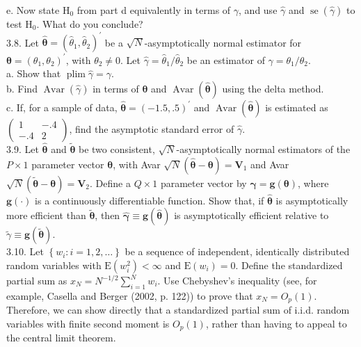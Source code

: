\documentclass[10pt]{article}
\begin{document}
e. Now state $\mathrm{H}_{0}$ from part d equivalently in terms of $\gamma$, and use $\hat{\gamma}$ and $\operatorname{se}(\hat{\gamma})$ to test $\mathrm{H}_{0}$. What do you conclude?\\
3.8. Let $\hat{\boldsymbol{\theta}}=\left(\hat{\theta}_{1}, \hat{\theta}_{2}\right)^{\prime}$ be a $\sqrt{N}$-asymptotically normal estimator for $\boldsymbol{\theta}=\left(\theta_{1}, \theta_{2}\right)^{\prime}$, with $\theta_{2} \neq 0$. Let $\hat{\gamma}=\hat{\theta}_{1} / \hat{\theta}_{2}$ be an estimator of $\gamma=\theta_{1} / \theta_{2}$.\\
a. Show that $\operatorname{plim} \hat{\gamma}=\gamma$.\\
b. Find $\operatorname{Avar}(\hat{\gamma})$ in terms of $\boldsymbol{\theta}$ and $\operatorname{Avar}(\hat{\boldsymbol{\theta}})$ using the delta method.\\
c. If, for a sample of data, $\hat{\boldsymbol{\theta}}=(-1.5, .5)^{\prime}$ and $\operatorname{Avar}(\hat{\boldsymbol{\theta}})$ is estimated as $\left(\begin{array}{cc}1 & -.4 \\ -.4 & 2\end{array}\right)$, find the asymptotic standard error of $\hat{\gamma}$.\\
3.9. Let $\hat{\boldsymbol{\theta}}$ and $\tilde{\boldsymbol{\theta}}$ be two consistent, $\sqrt{N}$-asymptotically normal estimators of the $P \times 1$ parameter vector $\boldsymbol{\theta}$, with Avar $\sqrt{N}(\hat{\boldsymbol{\theta}}-\boldsymbol{\theta})=\mathbf{V}_{1}$ and Avar $\sqrt{N}(\tilde{\boldsymbol{\theta}}-\boldsymbol{\theta})=\mathbf{V}_{2}$. Define a $Q \times 1$ parameter vector by $\boldsymbol{\gamma}=\mathbf{g}(\boldsymbol{\theta})$, where $\mathbf{g}(\cdot)$ is a continuously differentiable function. Show that, if $\hat{\boldsymbol{\theta}}$ is asymptotically more efficient than $\tilde{\boldsymbol{\theta}}$, then $\hat{\boldsymbol{\gamma}} \equiv \mathbf{g}(\hat{\boldsymbol{\theta}})$ is asymptotically efficient relative to $\tilde{\gamma} \equiv \mathbf{g}(\tilde{\boldsymbol{\theta}})$.\\
3.10. Let $\left\{w_{i}: i=1,2, \ldots\right\}$ be a sequence of independent, identically distributed random variables with $\mathrm{E}\left(w_{i}^{2}\right)<\infty$ and $\mathrm{E}\left(w_{i}\right)=0$. Define the standardized partial sum as $x_{N}=N^{-1 / 2} \sum_{i=1}^{N} w_{i}$. Use Chebyshev's inequality (see, for example, Casella and Berger (2002, p. 122)) to prove that $x_{N}=O_{p}(1)$. Therefore, we can show directly that a standardized partial sum of i.i.d. random variables with finite second moment is $O_{p}(1)$, rather than having to appeal to the central limit theorem.\\
\end{document}
